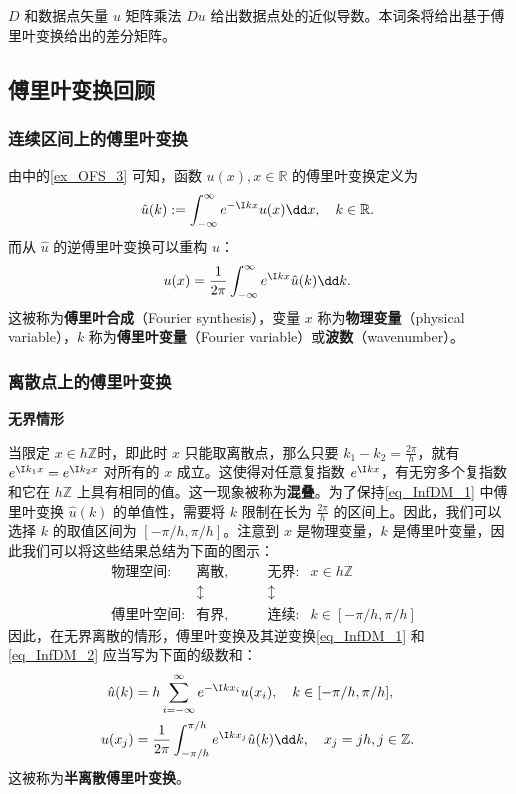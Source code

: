 
 $D$ 和数据点矢量 $u$ 矩阵乘法 $Du$ 给出数据点处的近似导数。本词条将给出基于傅里叶变换给出的差分矩阵。
\subsection{傅里叶变换回顾}
\subsubsection{连续区间上的傅里叶变换}
由中的\autoref{ex_OFS_3} 可知，函数 $u(x),x\in\mathbb R$ 的傅里叶变换定义为
\begin{equation}\label{eq_InfDM_1}
\hat u(k):=\int_{-\infty}^{\infty} e^{-\I kx}u(x)\dd x,\quad k\in\mathbb R.~
\end{equation}
而从 $\hat u$ 的逆傅里叶变换可以重构 $u$：
\begin{equation}\label{eq_InfDM_2}
u(x)=\frac{1}{2\pi}\int_{-\infty}^{\infty} e^{\I kx}\hat u(k)\dd k.~
\end{equation}
这被称为\textbf{傅里叶合成}（Fourier synthesis），变量 $x$ 称为\textbf{物理变量}（physical variable），$k$ 称为\textbf{傅里叶变量}（Fourier variable）或\textbf{波数}（wavenumber）。

\subsubsection{离散点上的傅里叶变换}
\textbf{无界情形}

当限定 $x\in h\mathbb Z$时，即此时 $x$ 只能取离散点，那么只要 $k_1-k_2=\frac{2\pi}{h}$，就有 $e^{\I k_1x}=e^{\I k_2x}$ 对所有的 $x$ 成立。这使得对任意复指数 $e^{\I kx}$，有无穷多个复指数和它在 $h\mathbb Z$ 上具有相同的值。这一现象被称为\textbf{混叠}。为了保持\autoref{eq_InfDM_1} 中傅里叶变换 $\hat u(k)$ 的单值性，需要将 $k$ 限制在长为 $\frac{2\pi}{h}$ 的区间上。因此，我们可以选择 $k$ 的取值区间为 $[-\pi/h,\pi/h]$。注意到 $x$ 是物理变量，$k$ 是傅里叶变量，因此我们可以将这些结果总结为下面的图示：
\begin{equation}
\begin{aligned}
&\text{物理空间:}& \text{离散},&\qquad\text{无界:} &x\in h\mathbb Z\\
&&\updownarrow&\qquad\updownarrow&\\
&\text{傅里叶空间:}& \text{有界},&\qquad\text{连续:} &k\in [-\pi/h,\pi/h]
\end{aligned}~
\end{equation}
因此，在无界离散的情形，傅里叶变换及其逆变换\autoref{eq_InfDM_1} 和\autoref{eq_InfDM_2} 应当写为下面的级数和：
\begin{equation}\label{eq_InfDM_3}
\begin{aligned}
\hat u(k)&=h\sum_{i=-\infty}^{\infty}e^{-\I kx_i}u(x_i),\quad k\in[-\pi/h,\pi/h],\\
u(x_j)&=\frac{1}{2\pi}\int_{-\pi/h}^{\pi/h} e^{\I kx_j}\hat u(k)\dd k,\quad x_j=jh,j\in \mathbb Z.
\end{aligned}~
\end{equation}
这被称为\textbf{半离散傅里叶变换}。

